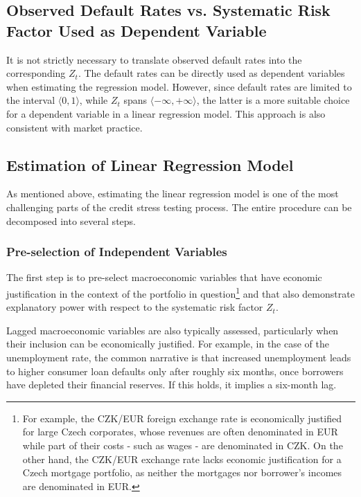 \documentclass[11pt,a4paper]{article}
\begin{document}
\subsection{Observed Default Rates vs. Systematic Risk Factor Used as Dependent Variable}

It is not strictly necessary to translate observed default rates into the corresponding $Z_t$. The default rates can be directly used as dependent variables when estimating the regression model. However, since default rates are limited to the interval $\langle 0,1 \rangle$, while $Z_t$ spans $\langle -\infty, +\infty \rangle$, the latter is a more suitable choice for a dependent variable in a linear regression model. This approach is also consistent with market practice.

\subsection{Estimation of Linear Regression Model}

As mentioned above, estimating the linear regression model is one of the most challenging parts of the credit stress testing process. The entire procedure can be decomposed into several steps.

\subsubsection{Pre-selection of Independent Variables}

The first step is to pre-select macroeconomic variables that have economic justification in the context of the portfolio in question\footnote{For example, the CZK/EUR foreign exchange rate is economically justified for large Czech corporates, whose revenues are often denominated in EUR while part of their costs - such as wages - are denominated in CZK. On the other hand, the CZK/EUR exchange rate lacks economic justification for a Czech mortgage portfolio, as neither the mortgages nor borrower's incomes are denominated in EUR.} and that also demonstrate explanatory power with respect to the systematic risk factor $Z_t$.

Lagged macroeconomic variables are also typically assessed, particularly when their inclusion can be economically justified. For example, in the case of the unemployment rate, the common narrative is that increased unemployment leads to higher consumer loan defaults only after roughly six months, once borrowers have depleted their financial reserves. If this holds, it implies a six-month lag.
\end{document}
